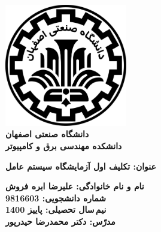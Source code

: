 \begin{titlepage}
\begin{center}
\includegraphics[width=0.4\textwidth]{figures/IUT Logo.png}\\
        
\LARGE
\textbf{دانشگاه صنعتی اصفهان}\\
\textbf{دانشکده مهندسی برق و کامپیوتر}\\
        
\vfill
        
\huge
\textbf{عنوان: تکلیف اول آزمایشگاه سیستم عامل}\\
        
\vfill
        
\LARGE
\textbf{نام و نام خانوادگی: علیرضا ابره فروش}\\
\textbf{شماره دانشجویی: 9816603}\\
\textbf{نیم\,سال تحصیلی: پاییز 1400}\\
\textbf{مدرّس: دکتر محمدرضا حیدرپور}\\
\end{center}
\end{titlepage}
